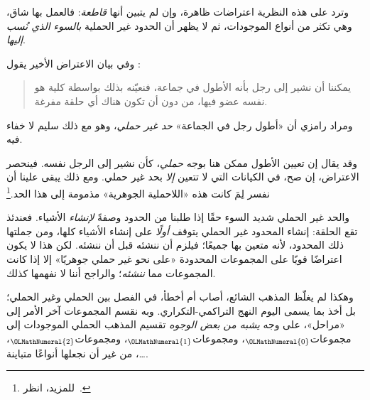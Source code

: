 \documentclass[../../../include/open-logic-section]{subfiles}
\begin{document}
وترد على هذه النظرية اعتراضات ظاهرة، وإن لم يتبين أنها \emph{قاطعة}:
فالعمل بها شاق، وهي تكثر من أنواع الموجودات، ثم لا يظهر أن الحدود غير
الحملية \emph{بالسوء الذي نُسب إليها}.
	
وفي بيان الاعتراض الأخير يقول
\citeauthor{Ramsey1925}:
\begin{quote}
	يمكننا أن نشير إلى رجل بأنه الأطول في جماعة، فنعيّنه بذلك بواسطة
	كلية هو نفسه عضو فيها، من دون أن تكون هناك أي حلقة مفرغة.
	\citep{Ramsey1925}
\end{quote}
ومراد رامزي أن «أطول رجل في الجماعة» \emph{حد غير حملي}، وهو مع ذلك
سليم لا خفاء فيه.

وقد يقال إن تعيين الأطول ممكن هنا بوجه \emph{حملي}، كأن نشير إلى الرجل
نفسه. فينحصر الاعتراض، إن صح، في الكيانات التي لا تتعين \emph{إلا}
بحد غير حملي. ومع ذلك يبقى علينا أن نفسر لِمَ كانت هذه «اللاحملية
الجوهرية» مذمومة إلى هذا الحد.\footnote{للمزيد، انظر~\citet{Linnebo2010}.}

والحد غير الحملي شديد السوء حقًا إذا طلبنا من الحدود وصفةً
\emph{لإنشاء} الأشياء. فعندئذ تقع الحلقة: إنشاء المحدود غير الحملي
يتوقف \emph{أولًا} على إنشاء الأشياء كلها، ومن جملتها ذلك المحدود،
لأنه متعين بها جميعًا؛ فيلزم أن ننشئه قبل أن ننشئه. لكن هذا لا يكون
اعتراضًا قويًا على المجموعات المحدودة «على نحو غير حملي جوهريًا» إلا
إذا كانت المجموعات مما \emph{ننشئه}؛ والراجح أننا لا نفهمها كذلك.

وهكذا لم يغلّظ المذهب الشائع، أصاب أم أخطأ، في الفصل بين الحملي وغير
الحملي؛ بل أخذ بما يسمى اليوم النهج التراكمي-التكراري. وبه نقسم
المجموعات آخر الأمر إلى «مراحل»، على وجه \emph{يشبه من بعض الوجوه}
تقسيم المذهب الحملي الموجودات إلى مجموعات$_{\OLMathNumeral{0}}$، ومجموعات$_{\OLMathNumeral{1}}$،
ومجموعات$_{\OLMathNumeral{2}}$، \ldots، من غير أن نجعلها أنواعًا متباينة.
\end{document}
